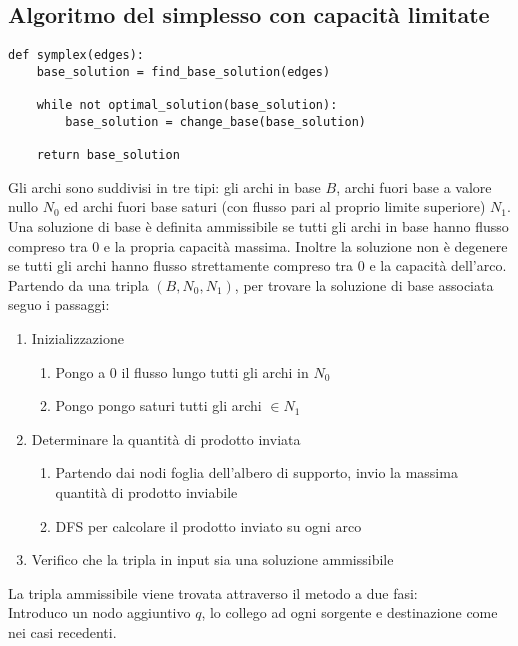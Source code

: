 \documentclass[../template]{subfiles}
\begin{document}
\subsection{Algoritmo del simplesso con capacità limitate}
\begin{lstlisting}
def symplex(edges):
    base_solution = find_base_solution(edges)

    while not optimal_solution(base_solution):
        base_solution = change_base(base_solution)

    return base_solution
\end{lstlisting}
Gli archi sono suddivisi in tre tipi: gli archi in base $B$, archi fuori base a valore nullo $N_0$ ed archi fuori base saturi
(con flusso pari al proprio limite superiore) $N_1$.
\\
Una soluzione di base è definita ammissibile se tutti gli archi in base hanno flusso compreso tra 0 e la propria capacità massima.
Inoltre la soluzione non è degenere se tutti gli archi hanno flusso strettamente compreso tra 0 e la capacità dell'arco.
\\
Partendo da una tripla $(B, N_0, N_1)$, per trovare la soluzione di base associata seguo i passaggi:
\begin{enumerate}
    \item Inizializzazione
        \begin{enumerate}
            \item Pongo a 0 il flusso lungo tutti gli archi in $N_0$
            \item Pongo pongo saturi tutti gli archi $\in N_1$
        \end{enumerate}
    \item Determinare la quantità di prodotto inviata
        \begin{enumerate}
            \item Partendo dai nodi foglia dell'albero di supporto, invio la massima quantità di prodotto inviabile
            \item DFS per calcolare il prodotto inviato su ogni arco
        \end{enumerate}
    \item Verifico che la tripla in input sia una soluzione ammissibile
\end{enumerate}

La tripla ammissibile viene trovata attraverso il metodo a due fasi:
\\
Introduco un nodo aggiuntivo $q$, lo collego ad ogni sorgente e destinazione come nei casi recedenti.
\end{document}

